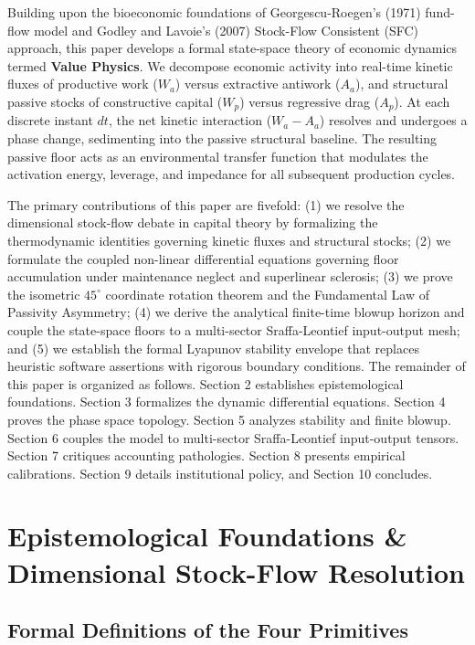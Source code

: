 \documentclass[preprint,12pt,authoryear]{elsarticle}
\theoremstyle{definition}
\begin{document}
Building upon the bioeconomic foundations of Georgescu-Roegen's (1971) fund-flow model and Godley and Lavoie's (2007) Stock-Flow Consistent (SFC) approach, this paper develops a formal state-space theory of economic dynamics termed \textbf{Value Physics}. We decompose economic activity into real-time kinetic fluxes of productive work ($W_a$) versus extractive antiwork ($A_a$), and structural passive stocks of constructive capital ($W_p$) versus regressive drag ($A_p$). At each discrete instant $dt$, the net kinetic interaction ($W_a - A_a$) resolves and undergoes a phase change, sedimenting into the passive structural baseline. The resulting passive floor acts as an environmental transfer function that modulates the activation energy, leverage, and impedance for all subsequent production cycles.

The primary contributions of this paper are fivefold: (1) we resolve the dimensional stock-flow debate in capital theory by formalizing the thermodynamic identities governing kinetic fluxes and structural stocks; (2) we formulate the coupled non-linear differential equations governing floor accumulation under maintenance neglect and superlinear sclerosis; (3) we prove the isometric $45^\circ$ coordinate rotation theorem and the Fundamental Law of Passivity Asymmetry; (4) we derive the analytical finite-time blowup horizon and couple the state-space floors to a multi-sector Sraffa-Leontief input-output mesh; and (5) we establish the formal Lyapunov stability envelope that replaces heuristic software assertions with rigorous boundary conditions. The remainder of this paper is organized as follows. Section 2 establishes epistemological foundations. Section 3 formalizes the dynamic differential equations. Section 4 proves the phase space topology. Section 5 analyzes stability and finite blowup. Section 6 couples the model to multi-sector Sraffa-Leontief input-output tensors. Section 7 critiques accounting pathologies. Section 8 presents empirical calibrations. Section 9 details institutional policy, and Section 10 concludes.

\section{Epistemological Foundations \& Dimensional Stock-Flow Resolution}

\subsection{Formal Definitions of the Four Primitives}
\end{document}
